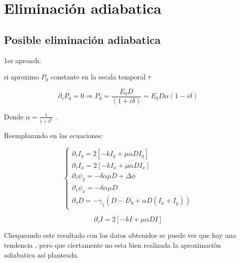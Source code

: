 \chapter{Eliminación adiabatica}

	\section{Posible eliminación adiabatica}
	
	1er aproach:
	
	
	si aproximo $P_0$ constante en la escala temporal $\tau$
	
	\[\partial_{\tau}P_0=0 \Longrightarrow P_0=\frac{E_0 D}{(1+i\delta  )}=E_0 D \alpha(1-i\delta )	\]
	
	Donde $\alpha=\tfrac{1}{1+\delta^2}$ .
	
	
	
	Reemplazando en las ecuaciones:
	
	\begin{equation}
	\begin{cases}
	\partial_{\tau}I_y=2[-k I_y +\mu\alpha D  I_y   ] \\
	\partial_{\tau}I_x=2[-k I_x +\mu \alpha D I_x   ]	\\	
	\partial_{\tau}\psi_y  = -\delta \alpha \mu  D+ \Delta \phi \\
	\partial_{\tau}\psi_x  = -\delta \alpha \mu D\\
	\partial_{\tau}D=-\gamma_{||}(D-D_0+\alpha D (I_x+I_y))
	\end{cases}
	\end{equation}
	
	\begin{equation}
	\partial_{\tau}I=2[-k I +\mu \alpha D I ] 
	\end{equation}
	
	
	
	Chequeando este resultado con los datos obtenidos se puede ver que hay una tendencia , pero que ciertamente no esta bien realizada la aproximación adiabatica así planteada.
	
